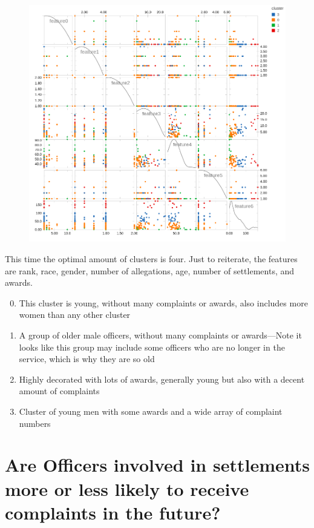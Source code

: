 \documentclass{article}
\begin{document}
\begin{figure}[h!]
\centering
\includegraphics[width=\textwidth]{cluster2.png}
\end{figure}

This time the optimal amount of clusters is four. Just to reiterate, the features are rank, race, gender, number of allegations, age, number of settlements, and awards.
\begin{enumerate}
\setcounter{enumi}{-1}
\item{This cluster is young, without many complaints or awards, also includes more women than any other cluster}
\item{A group of older male officers, without many complaints or awards---Note it looks like this group may include some officers who are no longer in the service, which is why they are so old}
\item{Highly decorated with lots of awards, generally young but also with a decent amount of complaints}
\item{Cluster of young men with some awards and a wide array of complaint numbers}
\end{enumerate}


\section{Are Officers involved in settlements more or less likely to receive complaints in the future?}
\end{document}
